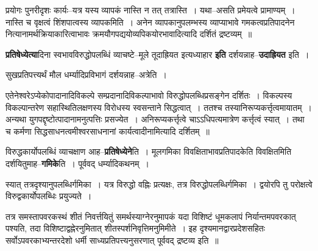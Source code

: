 \documentclass[article,12pt,a4paper]{memoir}
\begin{document}
	  \pstart प्रयोगः पुनरीदृशः कार्यः--यत्र यस्य व्यापकं नास्ति न तत् तत्रास्ति । यथा--असति प्रमेयत्वे प्रामाण्यम् । नास्ति च वृक्षत्वं शिंशपात्वस्य व्यापकमिति । अनेन व्यापकानुपलम्भस्य व्याप्याभावे गमकत्वप्रतिपादनेन नित्यानामर्थक्रियाकारित्वाभावः क्रमयौगपद्ययोव्यपिकयोरभावादित्यादि दर्शितं द्रष्टव्यम् ॥
	\pend
      

	  \pstart \textbf{प्रतिषेध्येत्या}दिना स्वभावविरुद्धोपलब्धिं व्याचष्टे--मूले तूदाह्रियत इत्यध्याहार \textbf{इति} दर्शयन्नाह--\textbf{उदाह्रियत} इति ।
	\pend
      

	  \pstart सुखप्रतिपत्त्यर्थं मौल धर्म्यादिप्रविभागं दर्शयन्नाह--अत्रेति ।
	\pend
      

	  \pstart एतेनेश्वरेऽप्येकोपादानादिविकल्पे सम्प्रदानादिविकल्पाभावो विरुद्धोपलब्धिप्रसङ्गेन दर्शितः । विकल्पस्य विकल्पान्तरेण सहास्थितिलक्षणस्य विरोधस्य स्वसन्ताने सिद्धत्वात् । ततश्च तस्यानिरूप्यकर्त्तृत्वमायातम् । अन्यथा युगपद्दृष्टोत्पादानामनुत्पत्तिः प्रसज्येत । अनिरूप्यकर्त्तृत्वे चाऽऽधिपत्यमात्रेण कर्त्तृत्वं स्यात् । तथा च कर्मणा सिद्धसाधनत्वमीश्वरसाधनानां कार्यत्वादीनामित्यादि दर्शितम् ॥
	\pend
      

	  \pstart विरुद्धकार्योपलब्धिं व्याचक्षाण आह--\textbf{प्रतिषेध्येने}ति । मूलगमिका विवक्षिताभावप्रतिपादकेति विवक्षितमिति दर्शयितुमाह--\textbf{गमिके}ति । पूर्ववद् धर्म्यादिकथनम् ।
	\pend
	  \bigskip
	  \begingroup
	

	  \pstart स्यात् तत्रदृश्यानुपलब्धिर्गमिका । यत्र विरुद्धो वह्निः प्रत्यक्षः, तत्र विरुद्धोपलब्धिर्गमिका । द्वयोरपि तु परोक्षत्वे विरुद्वकार्योपलब्धिः प्रयुज्यते ।
	\pend
        

	  \pstart {}तत्र समस्तापवरकस्थं शीतं निवर्त्तयितुं समर्थस्याग्नेरनुमापकं यदा विशिष्टं धूमकलापं निर्यान्तमपवरकात् पश्यति, तदा विशिष्टाद्वह्नेरनुमितात् शीतस्पर्शनिवृत्तिमनुमिमीते । इह दृश्यमानद्वारप्रदेशसहितः सर्वोऽपवरकाभ्यन्तरदेशो धर्मी साध्यप्रतिपत्त्यनुसरणात् पूर्ववद् द्रष्टव्य इति ॥
	\pend
        
\end{document}
